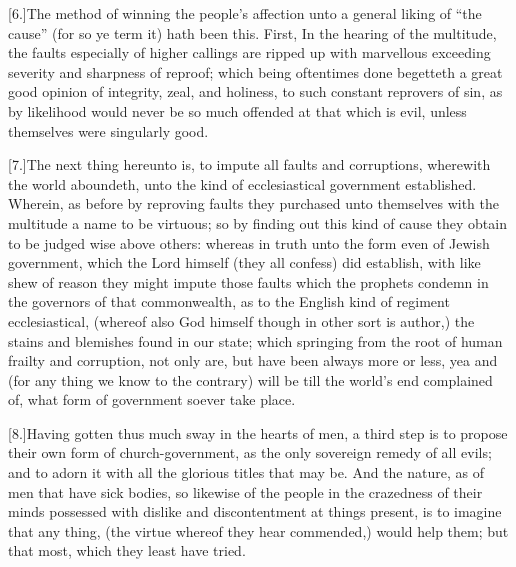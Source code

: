 [6.]The method of winning the people’s affection unto a general liking of “the cause” (for so ye term it) hath been this. First, In the hearing of the multitude, the faults especially of higher callings are ripped up with marvellous exceeding severity and sharpness of reproof; which being oftentimes done begetteth a great good opinion of integrity, zeal, and holiness, to such constant reprovers of sin, as by likelihood would never be so much offended at that which is evil, unless themselves were singularly good.

[7.]The next thing hereunto is, to impute all faults and corruptions, wherewith the world aboundeth, unto the kind of ecclesiastical government established. Wherein, as before by reproving faults they purchased unto themselves with the multitude a name to be virtuous; so by finding out this kind of cause they obtain to be judged wise above others: whereas in truth unto the form even of Jewish government, which the Lord himself (they all confess) did establish, with like shew of reason they might impute those faults which the prophets condemn in the governors of that commonwealth, as to the English kind of regiment ecclesiastical, (whereof also God himself though in other sort is author,) the stains and blemishes found in our state; which springing from the root of human frailty and corruption, not only are, but have been always more or less, yea and (for any thing we know to the contrary) will be till the world’s end complained of, what form of government soever take place.

[8.]Having gotten thus much sway in the hearts of men, a third step is to propose their own form of church-government, as the only sovereign remedy of all evils; and to adorn it with all the glorious titles that may be. And the nature, as of men that have sick bodies, so likewise of the people in the crazedness of their minds possessed with dislike and discontentment at things present, is to imagine that any thing, (the virtue whereof they hear commended,) would help them; but that most, which they least have tried.

